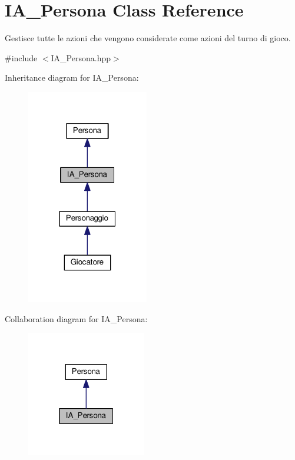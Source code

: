 \hypertarget{classIA__Persona}{}\section{I\+A\+\_\+\+Persona Class Reference}
\label{classIA__Persona}


Gestisce tutte le azioni che vengono considerate come azioni del turno di gioco.  




{\ttfamily \#include $<$I\+A\+\_\+\+Persona.\+hpp$>$}



Inheritance diagram for I\+A\+\_\+\+Persona\+:\nopagebreak
\begin{figure}[H]
\begin{center}
\leavevmode
\includegraphics[width=151pt]{classIA__Persona__inherit__graph}
\end{center}
\end{figure}


Collaboration diagram for I\+A\+\_\+\+Persona\+:\nopagebreak
\begin{figure}[H]
\begin{center}
\leavevmode
\includegraphics[width=148pt]{classIA__Persona__coll__graph}
\end{center}
\end{figure}
